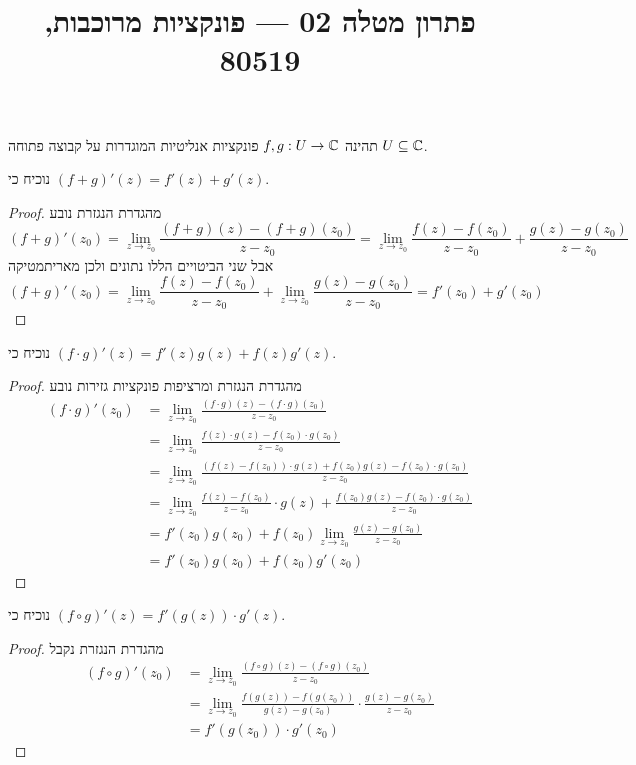 
\title{פתרון מטלה 02 --- פונקציות מרוכבות, 80519}


\maketitle
\maketitleprint{}

\Question{}
תהינה $f, g : U \to \mathbb{C}$ פונקציות אנליטיות המוגדרות על קבוצה פתוחה $U \subseteq \mathbb{C}$.

\Subquestion{}
נוכיח כי $(f + g)'(z) = f'(z) + g'(z)$.
\begin{proof}
	מהגדרת הנגזרת נובע
	\[
		(f + g)'(z_0)
		= \lim_{z \to z_0} \frac{(f + g)(z) - (f + g)(z_0)}{z - z_0}
		= \lim_{z \to z_0} \frac{f(z) - f(z_0)}{z - z_0} + \frac{g(z) - g(z_0)}{z - z_0}
	\]
	אבל שני הביטויים הללו נתונים ולכן מאריתמטיקה
	\[
		(f + g)'(z_0)
		= \lim_{z \to z_0} \frac{f(z) - f(z_0)}{z - z_0} + \lim_{z \to z_0}  \frac{g(z) - g(z_0)}{z - z_0}
		= f'(z_0) + g'(z_0)
	\]
\end{proof}

\Subquestion{}
נוכיח כי $(f \cdot g)'(z) = f'(z) g(z) + f(z) g'(z)$.
\begin{proof}
	מהגדרת הנגזרת ומרציפות פונקציות גזירות נובע
	\begin{align*}
		(f \cdot g)'(z_0)
		& = \lim_{z \to z_0} \frac{(f \cdot g)(z) - (f \cdot g)(z_0)}{z - z_0} \\
		& = \lim_{z \to z_0} \frac{f(z) \cdot g(z) - f(z_0) \cdot g(z_0)}{z - z_0} \\
		& = \lim_{z \to z_0} \frac{(f(z) - f(z_0)) \cdot g(z) + f(z_0) g(z) - f(z_0) \cdot g(z_0)}{z - z_0} \\
		& = \lim_{z \to z_0} \frac{f(z) - f(z_0)}{z - z_0} \cdot g(z) + \frac{f(z_0) g(z) - f(z_0) \cdot g(z_0)}{z - z_0} \\
		& = f'(z_0) g(z_0) + f(z_0) \lim_{z \to z_0} \frac{g(z) - g(z_0)}{z - z_0} \\
		& = f'(z_0) g(z_0) + f(z_0) g'(z_0)
	\end{align*}
\end{proof}

\Subquestion{}
נוכיח כי $(f \circ g)'(z) = f'(g(z)) \cdot g'(z)$.
\begin{proof}
	מהגדרת הנגזרת נקבל
	\begin{align*}
		(f \circ g)'(z_0)
		& = \lim_{z \to z_0} \frac{(f \circ g)(z) - (f \circ g)(z_0)}{z - z_0} \\
		& = \lim_{z \to z_0} \frac{f(g(z)) - f(g(z_0))}{g(z) - g(z_0)} \cdot \frac{g(z) - g(z_0)}{z - z_0} \\
		& = f'(g(z_0)) \cdot g'(z_0)
	\end{align*}
\end{proof}

